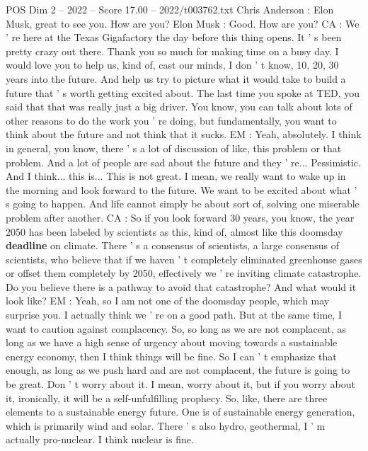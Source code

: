\begin{textsample}{POS Dim 2 – 2022 – Score 17.00 – 2022/t003762.txt}  \label{ex:f2_pos_032}
Chris Anderson : Elon Musk, great to see you.
How are you?
Elon Musk : Good.
How are you?
CA : We ' re here at the Texas Gigafactory the day before this thing opens.
It ' s been pretty crazy out there.
Thank you so much for making time on a busy day.
I would love you to help us, kind of, cast our minds, I don ' t know, 10, 20, 30 years into the future.
And help us try to picture what it would take to build a future that ' s worth getting excited about.
The last time you spoke at TED, you said that that was really just a big driver.
You know, you can talk about lots of other reasons to do the work you ' re doing, but fundamentally, you want to think about the future and not think that it sucks.
EM : Yeah, absolutely.
I think in general, you know, there ' s a lot of discussion of like, this problem or that problem.
And a lot of people are sad about the future and they ' re...
Pessimistic.
And I think... this is...
This is not great.
I mean, we really want to wake up in the morning and look forward to the future.
We want to be excited about what ' s going to happen.
And life cannot simply be about sort of, solving one miserable problem after another.
CA : So if you look forward 30 years, you know, the year 2050 has been labeled by scientists as this, kind of, almost like this doomsday \textbf{deadline} on climate.
There ' s a consensus of scientists, a large consensus of scientists, who believe that if we haven ' t completely eliminated greenhouse gases or offset them completely by 2050, effectively we ' re inviting climate catastrophe.
Do you believe there is a pathway to avoid that catastrophe?
And what would it look like?
EM : Yeah, so I am not one of the doomsday people, which may surprise you.
I actually think we ' re on a good path.
But at the same time, I want to caution against complacency.
So, so long as we are not complacent, as long as we have a high sense of urgency about moving towards a sustainable energy economy, then I think things will be fine.
So I can ' t emphasize that enough, as long as we push hard and are not complacent, the future is going to be great.
Don ' t worry about it.
I mean, worry about it, but if you worry about it, ironically, it will be a self-unfulfilling prophecy.
So, like, there are three elements to a sustainable energy future.
One is of sustainable energy generation, which is primarily wind and solar.
There ' s also hydro, geothermal, I ' m actually pro-nuclear.
I think nuclear is fine.

\end{textsample}
